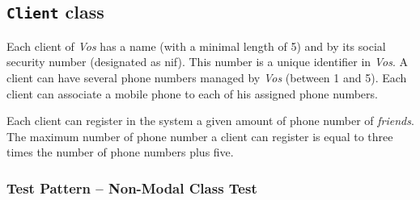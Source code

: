 %
%
%
\subsection{\texttt{Client} class}
\label{sec:classes.client}
Each client of \textit{Vos} has a name (with a minimal length of 5) and by its
social security number (designated as nif). This number is a unique identifier
in \textit{Vos}. A client can have several phone numbers managed by \textit{Vos}
(between 1 and 5). Each client can associate a mobile phone to each of his
assigned phone numbers.

Each client can register in the system a given amount of phone number of
\textit{friends}. The maximum number of phone number a client can register is
equal to three times the number of phone numbers plus five.

\subsubsection{Test Pattern -- Non-Modal Class Test}
\label{sec:classes.client.pattern}

